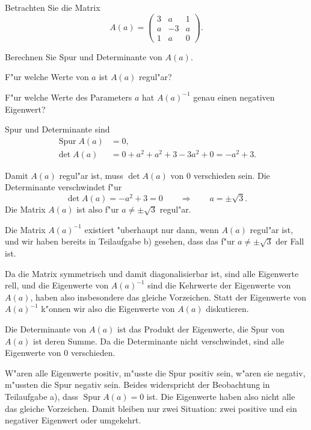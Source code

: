 Betrachten Sie die Matrix
\[
A(a)
=
\begin{pmatrix}
 3& a& 1\\
 a&-3& a\\
 1& a& 0
\end{pmatrix}.
\]
\begin{teilaufgaben}
\item
Berechnen Sie Spur und Determinante von $A(a)$.
\item 
F"ur welche Werte von $a$ ist $A(a)$ regul"ar?
\item
F"ur welche Werte des Parameters $a$ hat $A(a)^{-1}$
genau einen negativen Eigenwert?
\end{teilaufgaben}

\begin{loesung}
\begin{teilaufgaben}
\item Spur und Determinante sind
\begin{align}
\operatorname{Spur} A(a)
&=
0,
\label{60000027:tr}
\\
\det A(a)
&=
0 + a^2 + a^2 + 3 - 3 a^2 + 0
=
-a^2+3.
\label{60000027:det}
\end{align}
\item
Damit $A(a)$ regul"ar ist, muss $\det A(a)$
von $0$ verschieden sein.
Die Determinante verschwindet f"ur
\[
\det A(a)
=
-a^2+3
=
0
\qquad
\Rightarrow
\qquad
a=\pm\sqrt{3}.
\]
Die Matrix $A(a)$ ist also f"ur $a\ne\pm\sqrt{3}$ regul"ar.
\item
Die Matrix $A(a)^{-1}$ existiert "uberhaupt nur dann, wenn $A(a)$
regul"ar ist, und wir haben bereits in Teilaufgabe b) gesehen, dass
das f"ur $a\ne\pm\sqrt{3}$ der Fall ist.

Da die Matrix symmetrisch und damit diagonalisierbar ist, sind alle
Eigenwerte rell, und die Eigenwerte von $A(a)^{-1}$ sind die
Kehrwerte der Eigenwerte von $A(a)$, haben also insbesondere
das gleiche Vorzeichen.
Statt der Eigenwerte von $A(a)^{-1}$ k"onnen wir also die Eigenwerte
von $A(a)$ diskutieren.

Die Determinante von $A(a)$ ist das Produkt der Eigenwerte, die Spur
von $A(a)$ ist deren Summe.
Da die Determinante nicht verschwindet, sind alle Eigenwerte von $0$
verschieden.

W"aren alle Eigenwerte positiv, m"usste die Spur positiv sein,
w"aren sie negativ, m"ussten die Spur negativ sein.
Beides widerspricht der Beobachtung in Teilaufgabe a), dass 
$\operatorname{Spur}A(a)=0$ ist.
Die Eigenwerte haben also nicht alle das gleiche Vorzeichen.
Damit bleiben nur zwei Situation: zwei positive und ein negativer
Eigenwert oder umgekehrt.


\end{teilaufgaben}
\end{loesung}
